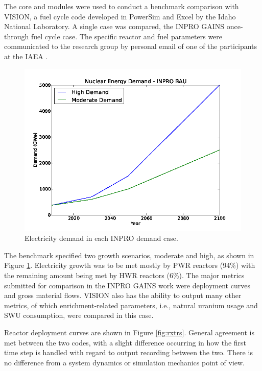 The \Cyclus core and \Cycamore modules were used to conduct a benchmark
comparison with VISION, a fuel cycle code developed in PowerSim and Excel by the
Idaho National Laboratory. A single case was compared, the INPRO GAINS
\cite{_international_2009} once-through fuel cycle case. The specific reactor
and fuel parameters were communicated to the research group by personal email of
one of the participants at the IAEA \cite{dixon_re:_2009}.

\begin{figure}[ht]
  \includegraphics[width=\linewidth]{./chapters/prevwork/graphs/inpro-demand.png}
  \caption{Electricity demand in each INPRO demand case.}
  \label{fig:inpro-demand}
\end{figure}

The benchmark specified two growth scenarios, moderate and high, as shown in
Figure \ref{fig:inpro-demand}. Electricity growth was to be met mostly by PWR
reactors (94\%) with the remaining amount being met by HWR reactors (6\%). The
major metrics submitted for comparison in the INPRO GAINS work were deployment
curves and gross material flows. VISION also has the ability to output many
other metrics, of which enrichment-related parameters, i.e., natural uranium
usage and SWU consumption, were compared in this case.

Reactor deployment curves are shown in Figure \ref{fig:rxtrs}. General agreement
is met between the two codes, with a slight difference occurring in how the first
time step is handled with regard to output recording between the two. There is
no difference from a system dynamics or simulation mechanics point of view. 

